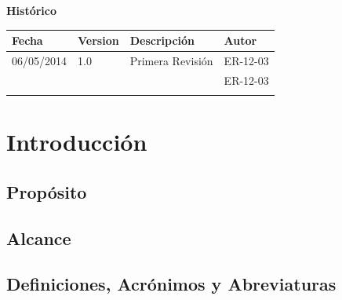\documentclass[12pt, a4paper, titlepage]{article}
\begin{document}
\begin{titlepage}
\vspace{2cm}

\begin{center}
	\large{\textbf{Histórico}}
	
    \begin{tabular}{ | p{4cm} | p{2cm} | p{6cm} | p{3cm} |}
    \hline
    \textbf{Fecha} & \textbf{Version} & \textbf{Descripción} & \textbf{Autor} \\ \hline
      06/05/2014 & 1.0 & Primera Revisión & ER-12-03\\ \hline
      &  &  & ER-12-03\\ \hline
     &  & &\\ \hline
    \end{tabular}
\end{center}


\end{titlepage}
\clearpage


\tableofcontents
\clearpage

\section{Introducción}

\subsection{Propósito}


\subsection{Alcance}

\subsection{Definiciones, Acrónimos y Abreviaturas}
\end{document}
